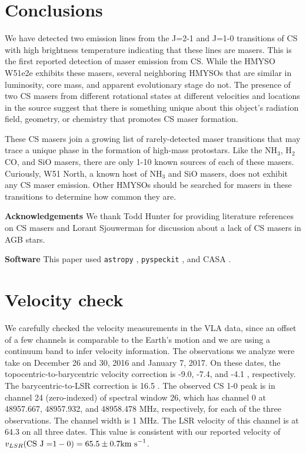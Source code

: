 \documentclass[twocolumn]{aastex62}
\begin{document}
\section{Conclusions}
We have detected two emission lines from the J=2-1 and J=1-0 transitions of CS
with high brightness temperature indicating that these lines are masers.
This is the first reported detection of maser emission from CS.
While the HMYSO W51e2e exhibits these masers, several neighboring HMYSOs that
are similar in luminosity, core mass, and apparent evolutionary stage
do not.  The presence of two CS masers from different rotational states
at different velocities and locations in the source suggest that there is something
unique about this object's radiation field, geometry, or chemistry that
promotes CS maser formation.

These CS masers join a growing list of rarely-detected maser transitions
that may trace a unique phase in the formation of high-mass protostars.
Like the NH$_3$, H$_2$CO, and SiO masers, there are only 1-10 known sources of
each of these masers.  Curiously, W51 North, a known host of NH$_3$ and SiO masers,
does not exhibit any CS maser emission.  Other HMYSOs should be searched for
masers in these transitions to determine how common they are.

\textbf{Acknowledgements}
We thank Todd Hunter for providing literature references on CS masers and
Lorant Sjouwerman for discussion about a lack of CS masers in AGB stars.

\textbf{Software}
This paper used \texttt{astropy}
\citep{Astropy-Collaboration2013a,Astropy-Collaboration2018a},
\texttt{pyspeckit} \citep{Ginsburg2011c}, and CASA \citep{McMullin2007a}.

\appendix
\section{Velocity check}
We carefully checked the velocity measurements in the VLA data, since an offset
of a few channels is comparable to the Earth's motion and we are using a
continuum band to infer velocity information.  The observations we analyze were
take on December 26 and 30, 2016 and January 7, 2017.  On these dates, the
topocentric-to-barycentric velocity correction is -9.0, -7.4, and -4.1 \kms,
respectively.  The barycentric-to-LSR correction is 16.5 \kms.  The observed CS
1-0 peak is in channel 24 (zero-indexed) of spectral window 26, which has
channel 0 at  48957.667, 48957.932, and 48958.478 MHz, respectively, for each
of the three observations.  The channel width is 1 MHz.  The LSR velocity of
this channel is at 64.3 \kms on all three dates.  This value is consistent with
our reported velocity of $v_{LSR}(\mathrm{CS~J=}1-0) = 65.5 \pm 0.7 \textrm{km~s}^{-1}$.
\end{document}
